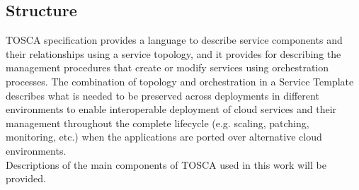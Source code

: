 \subsection*{Structure}
TOSCA specification provides a language to describe service components and their relationships using a service topology, and it provides for describing the management procedures that create or modify services using orchestration processes.
The combination of topology and orchestration in a Service Template describes what is needed to be preserved across deployments in different environments to enable interoperable deployment of cloud services and their management throughout the complete lifecycle (e.g. scaling, patching, monitoring, etc.) when the applications are ported over alternative cloud environments. \cite{TOSCA-v1.0_book} \\
Descriptions of the main components of TOSCA used in this work will be provided.
